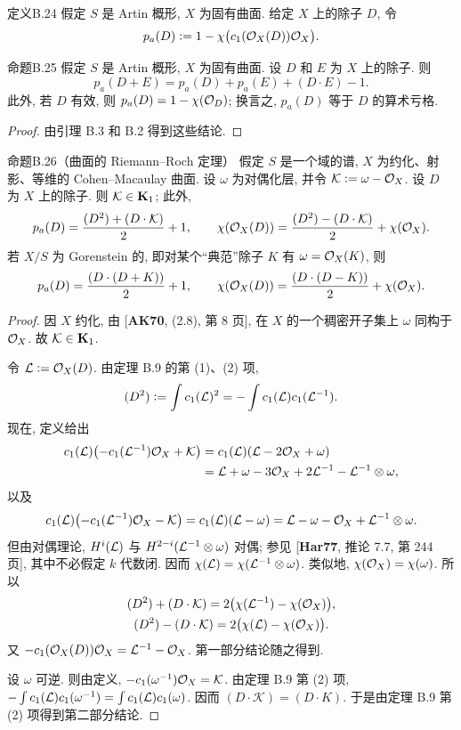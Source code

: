 \begin{origstatement}{定义}{B.24}\label{appB:24}
假定 $S$ 是 Artin 概形, $X$ 为固有曲面. 给定 $X$ 上的除子 $D$, 令
\[p_a(D)\mathrel{\mathop:}=1-\chi\bigl(c_1(\mathcal O_X(D))\mathcal O_X\bigr).\]
\end{origstatement}

\begin{origstatement}{命题}{B.25}\label{appB:25}
假定 $S$ 是 Artin 概形, $X$ 为固有曲面. 设 $D$ 和 $E$ 为 $X$ 上的除子. 则
\[p_a(D+E)=p_a(D)+p_a(E)+(D\cdot E)-1.\]
此外, 若 $D$ 有效, 则 $p_a(D)=1-\chi(\mathcal O_D)$; 换言之, $p_a(D)$ 等于 $D$ 的算术亏格.
\end{origstatement}
\begin{proof}
由引理 B.3 和 B.2 得到这些结论.
\end{proof}

\begin{origstatement}{命题}{B.26（曲面的 Riemann--Roch 定理）}\label{appB:26}
假定 $S$ 是一个域的谱, $X$ 为约化、射影、等维的 Cohen--Macaulay 曲面. 设 $\omega$ 为对偶化层, 并令 $\mathcal K\mathrel{\mathop:}=\omega-\mathcal O_X$. 设 $D$ 为 $X$ 上的除子. 则 $\mathcal K\in\mathbf K_1$; 此外,
\[p_a(D)=\frac{(D^2)+(D\cdot\mathcal K)}2+1,\qquad
\chi(\mathcal O_X(D))=\frac{(D^2)-(D\cdot\mathcal K)}2+\chi(\mathcal O_X).\]
若 $X/S$ 为 Gorenstein 的, 即对某个“典范”除子 $K$ 有 $\omega=\mathcal O_X(K)$, 则
\[p_a(D)=\frac{(D\cdot(D+K))}2+1,\qquad
\chi(\mathcal O_X(D))=\frac{(D\cdot(D-K))}2+\chi(\mathcal O_X).\]
\end{origstatement}
\begin{proof}
因 $X$ 约化, 由 [\textbf{AK70}, (2.8), 第 8 页], 在 $X$ 的一个稠密开子集上 $\omega$ 同构于 $\mathcal O_X$. 故 $\mathcal K\in\mathbf K_1$.

令 $\mathcal L\mathrel{\mathop:}=\mathcal O_X(D)$. 由定理 B.9 的第 (1)、(2) 项,
\[(D^2)\mathrel{\mathop:}=\int c_1(\mathcal L)^2=-\int c_1(\mathcal L)c_1(\mathcal L^{-1}).\]
现在, 定义给出
\begin{align*}
c_1(\mathcal L)\bigl(-c_1(\mathcal L^{-1})\mathcal O_X+\mathcal K\bigr)
&=c_1(\mathcal L)(\mathcal L-2\mathcal O_X+\omega)\\
&=\mathcal L+\omega-3\mathcal O_X+2\mathcal L^{-1}-\mathcal L^{-1}\otimes\omega,
\end{align*}
以及
\[c_1(\mathcal L)\bigl(-c_1(\mathcal L^{-1})\mathcal O_X-\mathcal K\bigr)
=c_1(\mathcal L)(\mathcal L-\omega)=\mathcal L-\omega-\mathcal O_X+\mathcal L^{-1}\otimes\omega.\]
但由对偶理论, $H^i(\mathcal L)$ 与 $H^{2-i}(\mathcal L^{-1}\otimes\omega)$ 对偶; 参见 [\textbf{Har77}, 推论 7.7, 第 244 页], 其中不必假定 $k$ 代数闭. 因而 $\chi(\mathcal L)=\chi(\mathcal L^{-1}\otimes\omega)$. 类似地, $\chi(\mathcal O_X)=\chi(\omega)$. 所以
\begin{gather*}
(D^2)+(D\cdot\mathcal K)=2\bigl(\chi(\mathcal L^{-1})-\chi(\mathcal O_X)\bigr),\\
(D^2)-(D\cdot\mathcal K)=2\bigl(\chi(\mathcal L)-\chi(\mathcal O_X)\bigr).
\end{gather*}
又 $-c_1(\mathcal O_X(D))\mathcal O_X=\mathcal L^{-1}-\mathcal O_X$. 第一部分结论随之得到.

设 $\omega$ 可逆. 则由定义, $-c_1(\omega^{-1})\mathcal O_X=\mathcal K$. 由定理 B.9 第 (2) 项, $-\int c_1(\mathcal L)c_1(\omega^{-1})=\int c_1(\mathcal L)c_1(\omega)$. 因而 $(D\cdot\mathcal K)=(D\cdot K)$. 于是由定理 B.9 第 (2) 项得到第二部分结论.
\end{proof}

